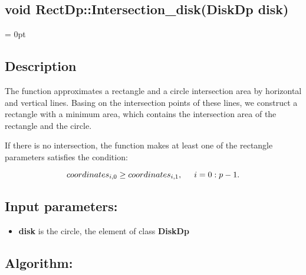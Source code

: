 \documentclass{report}
\begin{document}
	
	\label{Intersection}	
	\begin{center} 
		\section*{void RectDp::Intersection\_disk(DiskDp disk)}
	\end{center}
	
	\parindent = 0pt
	\subsection*{Description}
	
	The function approximates a rectangle and a circle intersection area by horizontal and vertical lines. Basing on the intersection points of these lines, we construct a rectangle with a minimum area, which contains the intersection area of the rectangle and the circle.
	
	If there is no intersection, the function makes at least one of the rectangle parameters satisfies the condition: 
	
	\begin{equation}
		coordinates_{i,0} \ge coordinates_{i,1} , \hspace*{5mm} i = 0:p-1.
		\label{eq:cond1}
	\end{equation}
	
	\subsection*{Input parameters:}
	
	\begin{itemize}
		\item {\bfseries disk}  is the circle, the element of class {\bfseries DiskDp} 
		
	\end{itemize}
	
	\subsection*{Algorithm:}
	
\end{document}
